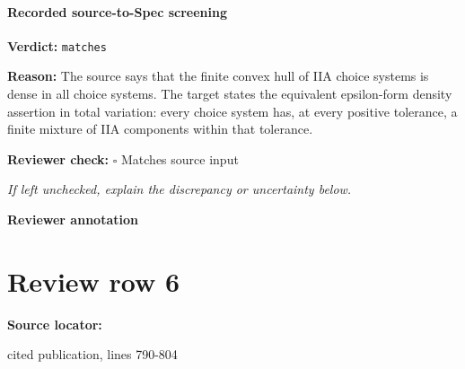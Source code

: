 \documentclass[10pt]{article}
\newcommand{\reviewerbox}{%
  \par\noindent\fbox{\parbox{0.96\linewidth}{\rule{0pt}{0.38in}}}\par
}
\newcommand{\reviewmatch}[1]{%
  \par\noindent\textbf{Reviewer check:} $\square$\; #1\par
  \noindent\emph{If left unchecked, explain the discrepancy or uncertainty below.}\par
}
\begin{document}
\paragraph{Recorded source-to-Spec screening}
\textbf{Verdict:} \texttt{matches}
\\
{\raggedright
\textbf{Reason:} The source says that the finite convex hull of IIA choice systems is dense in all choice systems.\allowbreak{} The target states the equivalent epsilon-\allowbreak{}form density assertion in total variation:\allowbreak{} every choice system has, at every positive tolerance, a finite mixture of IIA components within that tolerance.\allowbreak{}
\par}
\reviewmatch{Matches source input}
\noindent\textbf{Reviewer annotation}\par
\reviewerbox
\clearpage
\hypertarget{source-claim-79ec8422021db9ff}{}
\section*{Review row 6}
\textbf{Source locator:} {\footnotesize\raggedright cited publication, lines 790-\allowbreak{}804\par}
\end{document}
